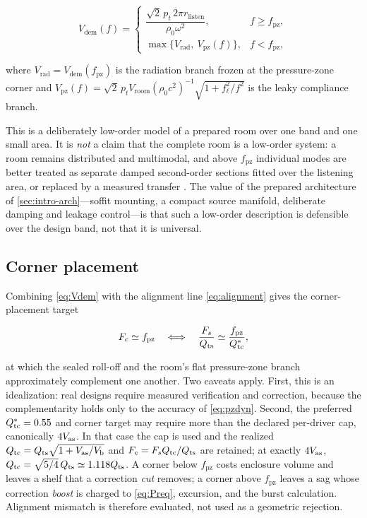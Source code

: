\begin{equation}
	V_{\mathrm{dem}}(f)=
	\begin{cases}
		\dfrac{\sqrt2\,p_t\,2\pi r_{\mathrm{listen}}}{\rho_0\omega^2},
			& f\ge f_{\mathrm{pz}},\\[2ex]
		\max\big\{V_{\mathrm{rad}},\ V_{\mathrm{pz}}(f)\big\},
			& f<f_{\mathrm{pz}},
	\end{cases}
	\label{eq:Vdem}
\end{equation}

where $V_{\mathrm{rad}}=V_{\mathrm{dem}}(f_{\mathrm{pz}})$ is the
radiation branch frozen at the pressure-zone corner and
$V_{\mathrm{pz}}(f)=\sqrt2\,p_tV_{\mathrm{room}}
(\rho_0c^2)^{-1}\sqrt{1+f_\ell^2/f^2}$ is the leaky compliance branch.

This is a deliberately low-order model of a prepared room over one band and
one small area. It is \emph{not} a claim that the complete room is a
low-order system: a room remains distributed and multimodal, and above
$f_{\mathrm{pz}}$ individual modes are better treated as separate damped
second-order sections fitted over the listening area, or replaced by a
measured transfer \cite{toole2006,makivirta2003}. The value of the prepared
architecture of \cref{sec:intro-arch}---soffit mounting, a compact source
manifold, deliberate damping and leakage control---is that such a low-order
description is defensible over the design band, not that it is universal.

\subsection{Corner placement}
\label{sec:room-corner}

Combining \cref{eq:Vdem} with the alignment line \cref{eq:alignment} gives
the corner-placement target

\begin{equation}
	F_c\simeq f_{\mathrm{pz}}
	\quad\Longleftrightarrow\quad
	\frac{F_s}{Q_{\mathrm{ts}}}\simeq\frac{f_{\mathrm{pz}}}{Q_{\mathrm{tc}}^\ast} ,
	\label{eq:Fsrule}
\end{equation}

at which the sealed roll-off and the room's flat pressure-zone branch
approximately complement one another. Two caveats apply. First, this is an
idealization: real designs require measured verification and correction,
because the complementarity holds only to the accuracy of
\cref{eq:pzdyn}. Second, the preferred $Q_{\mathrm{tc}}^\ast=0.55$ and corner target may require more
than the declared per-driver cap, canonically $4V_{\mathrm{as}}$. In that case the cap
is used and the realized
$Q_{\mathrm{tc}}=Q_{\mathrm{ts}}\sqrt{1+V_{\mathrm{as}}/V_{\mathrm{b}}}$ and
$F_c=F_sQ_{\mathrm{tc}}/Q_{\mathrm{ts}}$ are retained; at exactly $4V_{\mathrm{as}}$,
$Q_{\mathrm{tc}}=\sqrt{5/4}\,Q_{\mathrm{ts}}\simeq1.118Q_{\mathrm{ts}}$. A corner below
$f_{\mathrm{pz}}$ costs enclosure volume and leaves a shelf that a
correction \emph{cut} removes; a corner above $f_{\mathrm{pz}}$ leaves a
sag whose correction \emph{boost} is charged to \cref{eq:Preq}, excursion,
and the burst calculation. Alignment mismatch is therefore evaluated, not
used as a geometric rejection.

